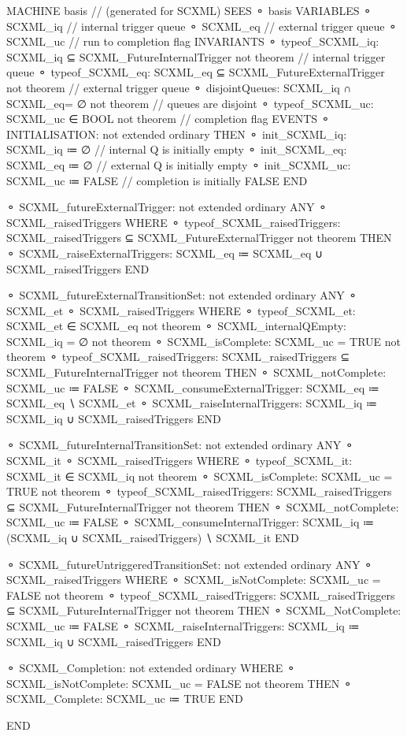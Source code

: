 \begin{EventBcode} 
MACHINE
		basis 	// (generated for SCXML)
	SEES
	⚬	 basis 
	VARIABLES
	⚬	SCXML_iq	 // internal trigger queue
	⚬	SCXML_eq	 // external trigger queue
	⚬	SCXML_uc	 // run to completion flag
	INVARIANTS
	⚬	typeof_SCXML_iq:	SCXML_iq ⊆ SCXML_FutureInternalTrigger not theorem // internal trigger queue
	⚬	typeof_SCXML_eq:	SCXML_eq ⊆ SCXML_FutureExternalTrigger not theorem // external trigger queue
	⚬	disjointQueues:	SCXML_iq ∩ SCXML_eq= ∅ not theorem // queues are disjoint
	⚬	typeof_SCXML_uc:	SCXML_uc ∈ BOOL not theorem // completion flag
	EVENTS
	⚬	INITIALISATION:	 not extended ordinary 
		THEN
		⚬	init_SCXML_iq:	SCXML_iq ≔ ∅ // internal Q is initially empty
		⚬	init_SCXML_eq:	SCXML_eq ≔ ∅ // external Q is initially empty
		⚬	init_SCXML_uc:	SCXML_uc ≔ FALSE // completion is initially FALSE
		END

	⚬	SCXML_futureExternalTrigger:	 not extended ordinary 
		ANY
		⚬	SCXML_raisedTriggers	 
		WHERE
		⚬	typeof_SCXML_raisedTriggers:	SCXML_raisedTriggers ⊆ SCXML_FutureExternalTrigger not theorem 
		THEN
		⚬	SCXML_raiseExternalTriggers:	SCXML_eq ≔ SCXML_eq ∪ SCXML_raisedTriggers 
		END

	⚬	SCXML_futureExternalTransitionSet:	 not extended ordinary 
		ANY
		⚬	SCXML_et	 
		⚬	SCXML_raisedTriggers	 
		WHERE
		⚬	typeof_SCXML_et:	SCXML_et ∈ SCXML_eq not theorem 
		⚬	SCXML_internalQEmpty:	SCXML_iq = ∅ not theorem 
		⚬	SCXML_isComplete:	SCXML_uc = TRUE not theorem 
		⚬	typeof_SCXML_raisedTriggers:	SCXML_raisedTriggers ⊆ SCXML_FutureInternalTrigger not theorem 
		THEN
		⚬	SCXML_notComplete:	SCXML_uc ≔ FALSE 
		⚬	SCXML_consumeExternalTrigger:	SCXML_eq ≔ SCXML_eq ∖ {SCXML_et} 
		⚬	SCXML_raiseInternalTriggers:	SCXML_iq ≔ SCXML_iq ∪ SCXML_raisedTriggers 
		END

	⚬	SCXML_futureInternalTransitionSet:	 not extended ordinary 
		ANY
		⚬	SCXML_it	 
		⚬	SCXML_raisedTriggers	 
		WHERE
		⚬	typeof_SCXML_it:	SCXML_it  ∈ SCXML_iq not theorem 
		⚬	SCXML_isComplete:	SCXML_uc = TRUE not theorem 
		⚬	typeof_SCXML_raisedTriggers:	SCXML_raisedTriggers ⊆ SCXML_FutureInternalTrigger not theorem 
		THEN
		⚬	SCXML_notComplete:	SCXML_uc ≔ FALSE 
		⚬	SCXML_consumeInternalTrigger:	SCXML_iq ≔ (SCXML_iq ∪ SCXML_raisedTriggers) ∖ {SCXML_it} 
		END

	⚬	SCXML_futureUntriggeredTransitionSet:	 not extended ordinary 
		ANY
		⚬	SCXML_raisedTriggers	 
		WHERE
		⚬	SCXML_isNotComplete:	SCXML_uc = FALSE not theorem 
		⚬	typeof_SCXML_raisedTriggers:	SCXML_raisedTriggers ⊆ SCXML_FutureInternalTrigger not theorem 
		THEN
		⚬	SCXML_NotComplete:	SCXML_uc ≔ FALSE 
		⚬	SCXML_raiseInternalTriggers:	SCXML_iq ≔ SCXML_iq ∪ SCXML_raisedTriggers 
		END

	⚬	SCXML_Completion:	 not extended ordinary 
		WHERE
		⚬	SCXML_isNotComplete:	SCXML_uc = FALSE not theorem 
		THEN
		⚬	SCXML_Complete:	SCXML_uc ≔ TRUE 
		END

	END
\end{EventBcode}